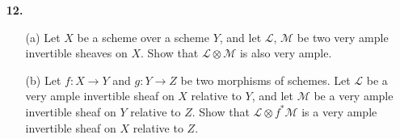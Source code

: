 \documentclass{article}
\begin{document}
\begin{enumerate} [label=\textbf{\arabic*.}, leftmargin=0em]
\begin{proof}
\begin{itemize} [leftmargin=0cm]
        Let $x_0, \dots, x_r \in S_1$ be a set of generators of $S_1$ as an $A$-module. Following the argument in (5.13), $S'$ is a ring, containing $S$, and contained in the intersection $\bigcap S_{x_i}$ of the localizations of $S$ at the elements $x_0, \dots, x_r$. By the proof of (5.19), since $S_d'$ is a finitely generated $A$-module for every $d$, there exists $d_0 \geq 0$ such that $S_n S'_d \subseteq S_{n + d} \subseteq S'_{n + d}$ for some large enough $n$ and all $d \geq d_0$. It follows by $S_n S'_d = S'_{n + d}$ that $S_{n + d} = S'_{n + d}$ for all $d \geq d_0$.

        \item[(c)] The natural homomorphism $\alpha$ viewed as a morphism between equivalence classes of quasi-finitely generated graded $S$-modules is an isomorphism by (b). Hence, the two categories are equivalent with $\beta$ from (5.15).

    \end{itemize}
\end{proof}

\item[\textbf{12.}] \begin{itemize}
    \item[(a)] Let $X$ be a scheme over a scheme $Y$, and let $\mathcal{L}$, $\mathcal{M}$ be two very ample invertible sheaves on $X$. Show that $\mathcal{L} \otimes \mathcal{M}$ is also very ample.

    \item[(b)] Let $f : X \to Y$ and $g : Y \to Z$ be two morphisms of schemes. Let $\mathcal{L}$ be a very ample invertible sheaf on $X$ relative to $Y$, and let $\mathcal{M}$ be a very ample invertible sheaf on $Y$ relative to $Z$. Show that $\mathcal{L} \otimes f^* \mathcal{M}$ is a very ample invertible sheaf on $X$ relative to $Z$.
\end{itemize}


\end{enumerate}
\end{document}

